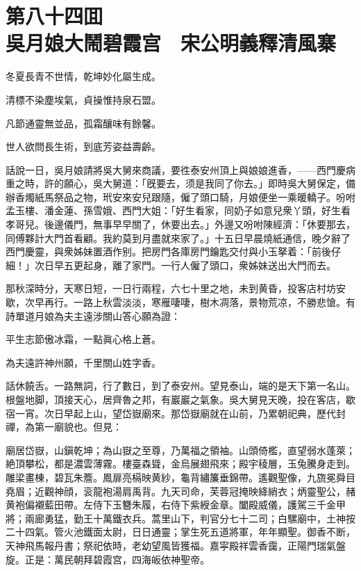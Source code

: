 
\chapter*{第八十四囬　\\吳月娘大鬧碧霞宫　宋公明義釋清風寨}


\begin{myquote}
冬夏長青不世情，乾坤妙化屬生成。

清標不染塵埃氣，貞操惟持泉石盟。

凡節通靈無並品，孤霜釀味有餘馨。

世人欲問長生術，到底芳姿益壽齡。
\end{myquote}

話說一日，吳月娘請將吳大舅來商議，要徃泰安州頂上與娘娘進香，——西門慶病重之時，許的願心，吳大舅道：「旣要去，须是我同了你去。」即時吳大舅保定，備辦香燭紙馬祭品之物，玳安來安兒跟隨，僱了頭口騎，月娘便坐一乘暖轎子。吩咐孟玉樓、潘金蓮、孫雪娥、西門大姐：「好生看家，同奶子如意兒衆丫頭，好生看孝哥兒。後邊儀門，無事早早關了，休要出去。」外邊又吩咐陳經濟：「休要那去，同傅夥計大門首看顧。我約莫到月盡就來家了。」十五日早晨燒紙通信，晚夕辭了西門慶靈，與衆姊妹置酒作别。把房門各庫房門鑰匙交付與小玉拏着：「前後仔細！」次日早五更起身，離了家門。一行人僱了頭口，衆姊妹送出大門而去。

那秋深時分，天寒日短，一日行兩程，六七十里之地，未到黄昏，投客店村坊安歇，次早再行。一路上秋雲淡淡，寒雁啛啛，樹木凋落，景物荒凉，不勝悲愴。有詩單道月娘為夫主遠涉關山答心願為證：

\begin{myquote}
平生志節傲冰霜，一點眞心格上蒼。

為夫遠許神州願，千里關山姓字香。
\end{myquote}

話休饒舌。一路無詞，行了數日，到了泰安州。望見泰山，端的是天下第一名山。根盤地脚，頂接天心，居齊魯之邦，有巖巖之氣象。吳大舅見天晚，投在客店，歇宿一宵。次日早起上山，望岱嶽廟來。那岱嶽廟就在山前，乃累朝祀典，歷代封禪，為第一廟貌也。但見：

\begin{myquote}
廟居岱嶽，山鎭乾坤；為山嶽之至尊，乃萬福之領袖。山頭倚檻，直望弱水蓬萊；絶頂攀松，都是濃雲薄霧。樓臺森聳，金烏展翅飛來；殿宇稜層，玉兔騰身走到。雕梁畫棟，碧瓦朱簷。鳳扉亮槅映黄紗，龜背繡簾垂錦帶。遙觀聖像，九旒冕舜目堯眉；近觀神顔，衮龍袍湯肩禹背。九天司命，芙蓉冠掩映絳綃衣；炳靈聖公，赭黄袍偏襯藍田帶。左侍下玉簪朱履，右侍下紫綬金章。闔殿威儀，護駕三千金甲將；兩廊勇猛，勤王十萬鐵衣兵。蒿里山下，判官分七十二司；白騾廟中，土神按二十四氣。管火池鐵面太尉，日日通靈；掌生死五道將軍，年年顯聖。御香不断，天神飛馬報丹書；祭祀依時，老幼望風皆獲福。嘉寜殿祥雲香靄，正陽門瑞氣盤旋。正是：萬民朝拜碧霞宫，四海皈依神聖帝。
\end{myquote}

